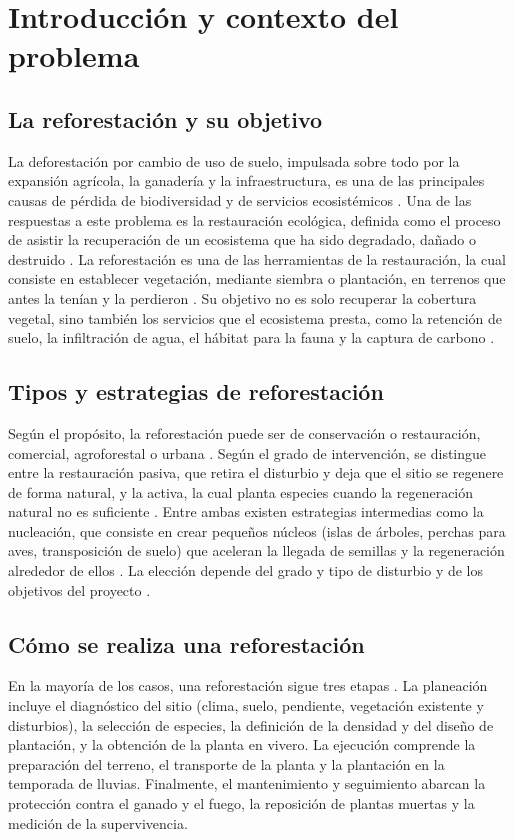\section{Introducción y contexto del problema}
\label{sec:introduccion}
 
\subsection{La reforestación y su objetivo}
La deforestación por cambio de uso de suelo, impulsada sobre todo por la expansión agrícola, la ganadería y la infraestructura, es una de las principales causas de pérdida de biodiversidad y de servicios ecosistémicos \autocite{geist2002}. Una de las respuestas a este problema es la restauración ecológica, definida como el proceso de asistir la recuperación de un ecosistema que ha sido degradado, dañado o destruido \autocite{ser2004}.
La reforestación es una de las herramientas de la restauración, la cual consiste en establecer vegetación, mediante siembra o plantación, en terrenos que antes la tenían y la perdieron \autocite{conafor2010}. Su objetivo no es solo recuperar la cobertura vegetal, sino también los servicios que el ecosistema presta, como la retención de suelo, la infiltración de agua, el hábitat para la fauna y la captura de carbono \autocite{chazdon2008}.
 
\subsection{Tipos y estrategias de reforestación}
Según el propósito, la reforestación puede ser de conservación o restauración, comercial, agroforestal o urbana \autocite{conafor2010}. Según el grado de intervención, se distingue entre la restauración pasiva, que retira el disturbio y deja que el sitio se regenere de forma natural, y la activa, la cual planta especies cuando la regeneración natural no es suficiente \autocite{holl2011}. Entre ambas existen estrategias intermedias como la nucleación, que consiste en crear pequeños núcleos (islas de árboles, perchas para aves, transposición de suelo) que aceleran la llegada de semillas y la regeneración alrededor de ellos \autocite{reis2010,corbin2012}. La elección depende del grado y tipo de disturbio y de los objetivos del proyecto \autocite{ser2004}.
 
\subsection{Cómo se realiza una reforestación}
En la mayoría de los casos, una reforestación sigue tres etapas \autocite{conafor2010}. La planeación incluye el diagnóstico del sitio (clima, suelo, pendiente, vegetación existente y disturbios), la selección de especies, la definición de la densidad y del diseño de plantación, y la obtención de la planta en vivero. La ejecución comprende la preparación del terreno, el transporte de la planta y la plantación en la temporada de lluvias. Finalmente, el mantenimiento y seguimiento abarcan la protección contra el ganado y el fuego, la reposición de plantas muertas y la medición de la supervivencia.
 

